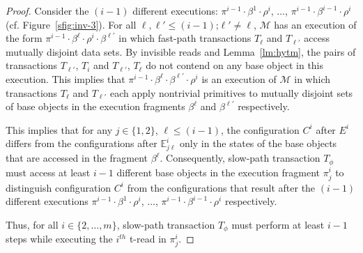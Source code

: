 \begin{proof}
Consider the $(i-1)$ different executions: 
$\pi^{i-1}\cdot\beta^{1}\cdot \rho^i$, $\ldots$, $\pi^{i-1}\cdot\beta^{i-1}\cdot \rho^i$ (cf. Figure~\ref{sfig:inv-3}).
For all $\ell, \ell' \leq (i-1)$;$\ell' \neq \ell$, 
$\mathcal{M}$ has an execution of the form $\pi^{i-1}\cdot \beta^{\ell}\cdot \rho^i \cdot \beta^{\ell'}$
in which fast-path transactions $T_{\ell}$ and $T_{\ell'}$ access mutually disjoint data sets.
By invisible reads and Lemma~\ref{lm:hytm}, the pairs of transactions $T_{\ell'}$, $T_{i}$ and $T_{\ell'}$, $T_{\ell}$
do not contend on any base object in this execution.
This implies that $\pi^{i-1}\cdot \beta^{\ell} \cdot \beta^{\ell'} \cdot \rho^i$ is an execution of $\mathcal{M}$ in which
transactions $T_{\ell}$ and $T_{\ell'}$ each apply nontrivial primitives
to mutually disjoint sets of base objects in the execution fragments $\beta^{\ell}$ and $\beta^{\ell'}$ respectively.

This implies that for any $j\in \{1,2\}$, $\ell \leq (i-1)$, the configuration $C^i$ after $E^i$ differs from the configurations
after $\mathbb{E}_{j\ell}^{i}$ only in the states of the base objects that are accessed in the fragment $\beta^{\ell}$.
Consequently, slow-path transaction $T_{\phi}$ must access at least $i-1$ different base objects
in the execution fragment $\pi_j^i$
to distinguish configuration $C^i$ from the configurations
that result after the $(i-1)$ different executions 
$\pi^{i-1}\cdot\beta^{1}\cdot \rho^i$, $\ldots$, $\pi^{i-1}\cdot\beta^{i-1}\cdot \rho^i$ respectively.

Thus, for all $i \in \{2,\ldots, m\}$, slow-path transaction $T_{\phi}$ must perform at least $i-1$ steps 
while executing the $i^{th}$ t-read in $\pi_{j}^i$.
\end{proof}
%
%